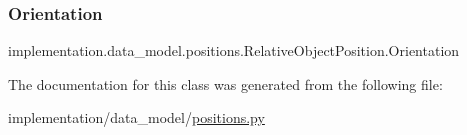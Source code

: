 \subsubsection{\texorpdfstring{Orientation}{Orientation}}
{\footnotesize\ttfamily implementation.\+data\+\_\+model.\+positions.\+Relative\+Object\+Position.\+Orientation\hspace{0.3cm}{\ttfamily [static]}}



The documentation for this class was generated from the following file\+:\begin{DoxyCompactItemize}
\item 
implementation/data\+\_\+model/\hyperlink{positions_8py}{positions.\+py}\end{DoxyCompactItemize}
